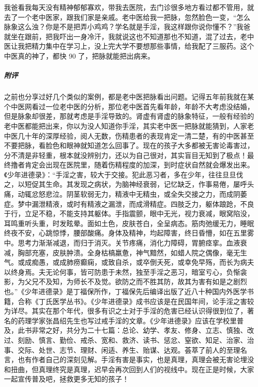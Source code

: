 \begin{case}
    我爸看我每天没有精神郁郁寡欢，带我去医院，去门诊很多地方看过都不管用，就去了一个老中医家，跟我们家是亲戚。老中医给我一把脉，忽然脸色一变，“怎么脉象这么浊？你是不是把弄小鸡鸡？学名就是手淫，我这样跟你说你懂不？”我爸就坐在跟前，把我吓出一身冷汗，我就说这也不知道那也不知道，混了过去，老中医让我把精力集中在学习上，没上完大学不要想那些事情，给我配了三服药。这个中医真的神了，都快 90 了，把脉就能把出病来。
    \subparagraph{附评} 之前也分享过好几个类似的案例，都是老中医把脉看出问题。记得五年前我就在某个中医网看过一位老中医的分析，那位老中医首先看年龄，年龄不大考虑没结婚，但是脉象却很差，那就考虑是手淫导致的。肾虚有肾虚的脉象特征，一般有经验的老中医都能把出来，你以为没人知道你手淫，其实老中医一把脉就能猜到，人家老中医几十年的深厚经验，阅人无数，伤精患者的表现肯定一清二楚，有的中医甚至不要把脉，看脸色和眼神就知道怎么回事了。现在的孩子大多都被无害论毒害过，分不清是非轻重，根本就没辨别力，还以为自己很对，其实盲目无知到了极点！最终撸者肯定会出现在医院里，随着伤精程度的加深，到时症状自然就会爆发出来。《少年进德录》：“手淫之害，较大于交接。犯此恶习者，多在少年，往往旦旦伐之，以短促其生命。其发现之病状，为脑神经衰弱，记忆缺乏，作事易倦，屡呼头痛，动辄忿怒悲泣。阴茎软弱无力，精液中无精虫，或全失交接之力，而成阴萎症。梦中漏泄精液，或时有精液之漏泄，而成滑精症。四肢乏力，躯体踉跄，不良于行，立足不稳，不能支持其躯体。手指震颤，眼中无光，视力衰减，眼窝陷没，耳鸣重听头重，时发眩晕。面如土色，皮肤苍白，全呈病态。筋肉弛缓无力，睡眠终夜不安，心跳惊悸，腰部酸痛。身体及精神，均起障害，终日昏懵，如在五里雾中。思考力渐渐减退，而归于消灭。关节疼痛，消化力障碍，胃腑痉挛。血液衰减，胸部充塞，皮肤肿溃。全身枯槁羸惫，神气黯然，如蜡人院之偶像，毫无生气。或成痴愚，或成肺痨癫痫，或致自杀，或卒倒夭死，或幸免早殇，而长为病夫以终身焉。夫无论何事，皆可防患于未然，独至手淫之恶习，暗室亏心，负惭衾影，为父兄不及知，为师长不及觉。欲防之而不胜其防，故其为害有如是之剧烈也。”《少年进德录》是丁福保所作，丁福保先后编译出版了近八十种国内外医学书籍，合称《丁氏医学丛书》。《少年进德录》成书应该是在民国年间，论手淫之害较为详尽。其实在那个年代，很多有识之士对于手淫的危害已经认识得很到位了，著名的药理学家张昌绍先生也写过戒手淫的文章。《少年进德录》应该在学校里普及，此书非常之好，共分为二十七篇：总论、幼学、孝友、修身、立志、慎独、改过、刻励、慎言、勤俭、戒杀、宽和、救济、读书、惩忿、窒欲、知足、治家、治事、交际、处世、志节、理财、闲适、养生、贻谋、达观。荟萃了前人的至理名言，也有作者自己的深刻见解。手淫有害是事实，也是真理，真理会被无害论埋没和扭曲，但真理终究是真理，迟早会再次回到人们的视线中。现在正是时候，大家一起宣传普及吧，拯救更多无知的孩子！
\end{case}

